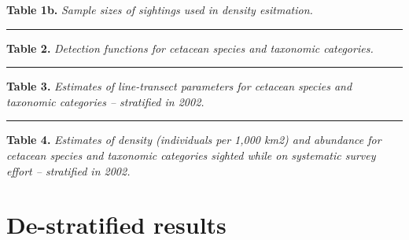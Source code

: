 \documentclass[
]{book}
\newenvironment{Shaded}{\begin{snugshade}}{\end{snugshade}}
\newcommand{\NormalTok}[1]{#1}
\newcommand{\OperatorTok}[1]{\textcolor[rgb]{0.81,0.36,0.00}{\textbf{#1}}}
\begin{document}
\textbf{Table 1b.} \emph{Sample sizes of sightings used in density esitmation.}

\begin{Shaded}
\end{Shaded}

\begin{center}\rule{0.5\linewidth}{0.5pt}\end{center}

\textbf{Table 2.} \emph{Detection functions for cetacean species and taxonomic categories.}

\begin{Shaded}
\end{Shaded}

\begin{center}\rule{0.5\linewidth}{0.5pt}\end{center}

\textbf{Table 3.} \emph{Estimates of line-transect parameters for cetacean species and taxonomic categories -- stratified in 2002.}

\begin{Shaded}
\end{Shaded}

\begin{center}\rule{0.5\linewidth}{0.5pt}\end{center}

\textbf{Table 4.} \emph{Estimates of density (individuals per 1,000 km2) and abundance for cetacean species and taxonomic categories sighted while on systematic survey effort -- stratified in 2002.}

\begin{Shaded}
\end{Shaded}

\hypertarget{de-stratified-results}{%
\section*{De-stratified results}\label{de-stratified-results}}
\end{document}

